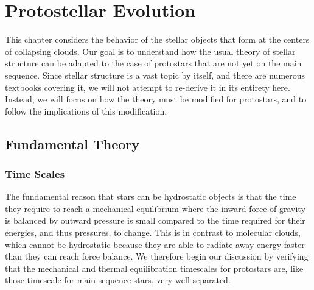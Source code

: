 \chapter{Protostellar Evolution}
\label{ch:protostar_evol}


This chapter considers the behavior of the stellar objects that form at the centers of collapsing clouds. Our goal is to understand how the usual theory of stellar structure can be adapted to the case of protostars that are not yet on the main sequence. Since stellar structure is a vast topic by itself, and there are numerous textbooks covering it, we will not attempt to re-derive it in its entirety here. Instead, we will focus on how the theory must be modified for protostars, and to follow the implications of this modification.

\section{Fundamental Theory}

\subsection{Time Scales}

The fundamental reason that stars can be hydrostatic objects is that the time they require to reach a mechanical equilibrium where the inward force of gravity is balanced by outward pressure is small compared to the time required for their energies, and thus pressures, to change. This is in contrast to molecular clouds, which cannot be hydrostatic because they are able to radiate away energy faster than they can reach force balance. We therefore begin our discussion by verifying that the mechanical and thermal equilibration timescales for protostars are, like those timescale for main sequence stars, very well separated.

